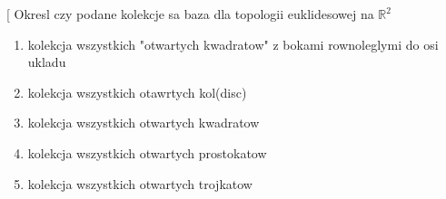 \documentclass{article}
\makeatletter
\def\myitem{%
   \@ifnextchar[ \@myitem{\@noitemargtrue\@myitem[\@itemlabel]}}
\def\@myitem[#1]{\item[#1]\mbox{}\\}
\makeatother
\begin{document}
\begin{enumerate}[align=left] %
        \renewcommand{\labelenumi}{\textbf{Cwiczenie 2.3.\arabic{enumi}}}
        \myitem Okresl czy podane kolekcje sa baza dla topologii euklidesowej na $\mathbb{R}^{2}$
        
        \begin{enumerate}
            \item kolekcja wszystkich "otwartych kwadratow" z bokami rownoleglymi do osi ukladu
            \item kolekcja wszystkich otawrtych kol(disc)
            \item kolekcja wszystkich otwartych kwadratow
            \item kolekcja wszystkich otwartych prostokatow
            \item kolekcja wszystkich otwartych trojkatow
          
        \end{enumerate}


\end{enumerate}
\end{document}
